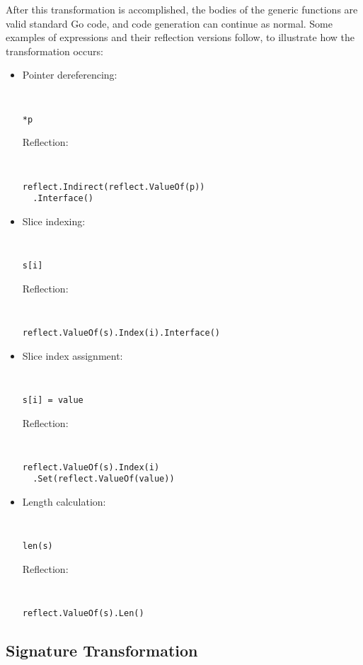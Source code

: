 \documentclass[letterpaper,twocolumn,11pt]{article}
\begin{document}
After this transformation is accomplished, the bodies of the generic functions are valid standard Go code, and code generation can continue as normal. Some examples of expressions and their reflection versions follow, to illustrate how the transformation occurs:

\begin{itemize}
\item
Pointer dereferencing:
{ \tt \small
\begin{verbatim}
*p
\end{verbatim}
}
Reflection:
{ \tt \small
\begin{verbatim}
reflect.Indirect(reflect.ValueOf(p))
  .Interface()
\end{verbatim}
}

\item
Slice indexing:
{ \tt \small
\begin{verbatim}
s[i]
\end{verbatim}
}
Reflection:
{ \tt \small
\begin{verbatim}
reflect.ValueOf(s).Index(i).Interface()
\end{verbatim}
}

\item
Slice index assignment:
{ \tt \small
\begin{verbatim}
s[i] = value
\end{verbatim}
}
Reflection:
{ \tt \small
\begin{verbatim}
reflect.ValueOf(s).Index(i)
  .Set(reflect.ValueOf(value))
\end{verbatim}
}

\item
Length calculation:
{ \tt \small
\begin{verbatim}
len(s)
\end{verbatim}
}
Reflection:
{ \tt \small
\begin{verbatim}
reflect.ValueOf(s).Len()
\end{verbatim}
}

\end{itemize}


\subsection{Signature Transformation} \label{signature_transformation}
\end{document}
